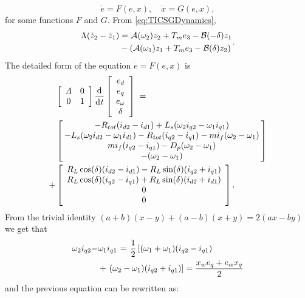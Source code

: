 \documentclass[letterpaper, 10 pt, conference]{ieeeconf}
\renewcommand{\o}    {{\omega}}
\newcommand{\half}   {{\frac{1}{2}}}
\newcommand{\m}      {{\hbox{\hskip 1pt}}}
\newcommand{\nm}     {{\hbox{\hskip -3pt}}}
\newcommand{\dd}     {{\rm d\hbox{\hskip 0.5pt}}}
\newcommand{\Amscr}  {{\mathcal{A}}}
\newcommand{\Bmscr}  {{\mathcal{B}}}
\begin{document}
\begin{equation}
\dot{e}=F(e,x) , \quad \dot{x}=G(e,x),\label{eq:sync_sestem}
\end{equation}
for some functions $F$ and $G$. From \eqref{eq:TICSGDynamics},
$$ \begin{aligned} \Lambda(\dot{z}_2-\dot{z}_1) &= \Amscr(\o_2)
   z_2+T_m e_3-\Bmscr(-\delta)z_1\\ &-\left(\Amscr(\o_1)z_1+T_m 
   e_3-\Bmscr(\delta)z_2\right) \end{aligned} \m.$$
The detailed form of the equation $\dot e=F(e,x)$ is
$$ \begin{aligned} & \left[\begin{array}{cc} \varLambda & 0\\ 0 & 
   1 \end{array}\right] \frac{\dd}{\dd t}\left[\begin{array}{c}
   e_d\\ e_q\\ e_\o\\ \delta\end{array}\right] \m= \\ & \left[\nm
   \begin{array}{c} -R_{tot}(i_{d2}-i_{d1})+L_s(\o_2 i_{q2}-
   \o_1 i_{q1})\\ -L_s(\o_2 i_{d2}-\o_1 i_{d1})-R_{tot} (i_{q2}
   -i_{q1})-mi_f(\o_2-\o_1)\\ mi_f(i_{q2}-i_{q1})-D_p(\o_2-\o_1)
   \\ -(\o_2-\o_1) \end{array}\nm\right]\\ + & \left[\begin{array}
   {c} R_L\cos(\delta)(i_{d2}-i_{d1})-R_L\sin(\delta)(i_{q2}
   +i_{q1})\\ R_L\cos(\delta)(i_{q2}-i_{q1})+R_L\sin(\delta)(i_{d2}
   +i_{d1})\\ 0\\ 0 \end{array}\right]. \end{aligned}$$
From the trivial identity \m $(a+b)(x-y)+(a-b)(x+y)=2(ax-by)$ we
get that \vspace{-2mm}
$$ \begin{aligned} \o_2 i_{q2} -& \o_1 i_{q1} \m=\m \half\left[
   (\o_1+\o_1)(i_{q2}-i_{q1}) \right.\\ &+ \left. (\o_2-\o_1)(i_{q2}
   +i_{q1})\right] = \frac{x_{w} e_q+e_w x_q}{2} \end{aligned}$$
and the previous equation can be rewritten as:
\end{document}
